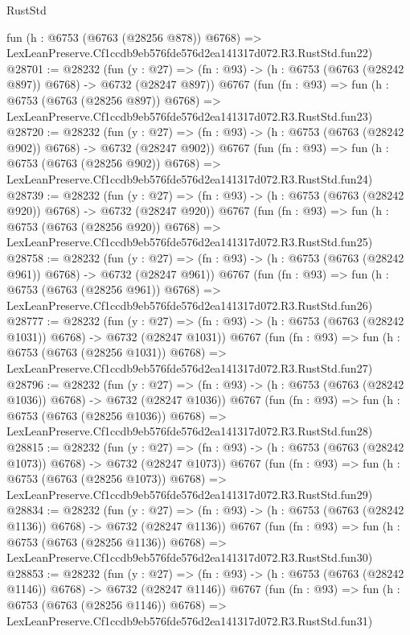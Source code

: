 \begin{lexlean}{RustStd}
\begin{coremodule}
    fun (h : @6753 (@6763 (@28256 @878)) @6768) =>
    LexLeanPreserve.Cf1ccdb9eb576fde576d2ea141317d072.R3.RustStd.fun22)
@28701 := @28232
    (fun (y : @27) => (fn : @93) -> (h : @6753 (@6763 (@28242 @897)) @6768) -> @6732 (@28247 @897))
    @6767
    (fun (fn : @93) =>
    fun (h : @6753 (@6763 (@28256 @897)) @6768) =>
    LexLeanPreserve.Cf1ccdb9eb576fde576d2ea141317d072.R3.RustStd.fun23)
@28720 := @28232
    (fun (y : @27) => (fn : @93) -> (h : @6753 (@6763 (@28242 @902)) @6768) -> @6732 (@28247 @902))
    @6767
    (fun (fn : @93) =>
    fun (h : @6753 (@6763 (@28256 @902)) @6768) =>
    LexLeanPreserve.Cf1ccdb9eb576fde576d2ea141317d072.R3.RustStd.fun24)
@28739 := @28232
    (fun (y : @27) => (fn : @93) -> (h : @6753 (@6763 (@28242 @920)) @6768) -> @6732 (@28247 @920))
    @6767
    (fun (fn : @93) =>
    fun (h : @6753 (@6763 (@28256 @920)) @6768) =>
    LexLeanPreserve.Cf1ccdb9eb576fde576d2ea141317d072.R3.RustStd.fun25)
@28758 := @28232
    (fun (y : @27) => (fn : @93) -> (h : @6753 (@6763 (@28242 @961)) @6768) -> @6732 (@28247 @961))
    @6767
    (fun (fn : @93) =>
    fun (h : @6753 (@6763 (@28256 @961)) @6768) =>
    LexLeanPreserve.Cf1ccdb9eb576fde576d2ea141317d072.R3.RustStd.fun26)
@28777 := @28232
    (fun (y : @27) =>
    (fn : @93) -> (h : @6753 (@6763 (@28242 @1031)) @6768) -> @6732 (@28247 @1031))
    @6767
    (fun (fn : @93) =>
    fun (h : @6753 (@6763 (@28256 @1031)) @6768) =>
    LexLeanPreserve.Cf1ccdb9eb576fde576d2ea141317d072.R3.RustStd.fun27)
@28796 := @28232
    (fun (y : @27) =>
    (fn : @93) -> (h : @6753 (@6763 (@28242 @1036)) @6768) -> @6732 (@28247 @1036))
    @6767
    (fun (fn : @93) =>
    fun (h : @6753 (@6763 (@28256 @1036)) @6768) =>
    LexLeanPreserve.Cf1ccdb9eb576fde576d2ea141317d072.R3.RustStd.fun28)
@28815 := @28232
    (fun (y : @27) =>
    (fn : @93) -> (h : @6753 (@6763 (@28242 @1073)) @6768) -> @6732 (@28247 @1073))
    @6767
    (fun (fn : @93) =>
    fun (h : @6753 (@6763 (@28256 @1073)) @6768) =>
    LexLeanPreserve.Cf1ccdb9eb576fde576d2ea141317d072.R3.RustStd.fun29)
@28834 := @28232
    (fun (y : @27) =>
    (fn : @93) -> (h : @6753 (@6763 (@28242 @1136)) @6768) -> @6732 (@28247 @1136))
    @6767
    (fun (fn : @93) =>
    fun (h : @6753 (@6763 (@28256 @1136)) @6768) =>
    LexLeanPreserve.Cf1ccdb9eb576fde576d2ea141317d072.R3.RustStd.fun30)
@28853 := @28232
    (fun (y : @27) =>
    (fn : @93) -> (h : @6753 (@6763 (@28242 @1146)) @6768) -> @6732 (@28247 @1146))
    @6767
    (fun (fn : @93) =>
    fun (h : @6753 (@6763 (@28256 @1146)) @6768) =>
    LexLeanPreserve.Cf1ccdb9eb576fde576d2ea141317d072.R3.RustStd.fun31)

\end{coremodule}
\end{lexlean}
